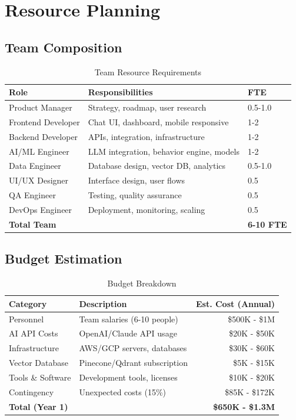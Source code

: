 \documentclass[12pt,a4paper]{article}
\begin{document}
\section{Resource Planning}

\subsection{Team Composition}

\begin{table}[h]
\centering
\begin{tabularx}{\textwidth}{|l|X|l|}
\hline
\textbf{Role} & \textbf{Responsibilities} & \textbf{FTE} \\
\hline
Product Manager & Strategy, roadmap, user research & 0.5-1.0 \\
\hline
Frontend Developer & Chat UI, dashboard, mobile responsive & 1-2 \\
\hline
Backend Developer & APIs, integration, infrastructure & 1-2 \\
\hline
AI/ML Engineer & LLM integration, behavior engine, models & 1-2 \\
\hline
Data Engineer & Database design, vector DB, analytics & 0.5-1.0 \\
\hline
UI/UX Designer & Interface design, user flows & 0.5 \\
\hline
QA Engineer & Testing, quality assurance & 0.5 \\
\hline
DevOps Engineer & Deployment, monitoring, scaling & 0.5 \\
\hline
\textbf{Total Team} & & \textbf{6-10 FTE} \\
\hline
\end{tabularx}
\caption{Team Resource Requirements}
\end{table}

\subsection{Budget Estimation}

\begin{table}[h]
\centering
\begin{tabularx}{\textwidth}{|l|X|r|}
\hline
\textbf{Category} & \textbf{Description} & \textbf{Est. Cost (Annual)} \\
\hline
Personnel & Team salaries (6-10 people) & \$500K - \$1M \\
\hline
AI API Costs & OpenAI/Claude API usage & \$20K - \$50K \\
\hline
Infrastructure & AWS/GCP servers, databases & \$30K - \$60K \\
\hline
Vector Database & Pinecone/Qdrant subscription & \$5K - \$15K \\
\hline
Tools \& Software & Development tools, licenses & \$10K - \$20K \\
\hline
Contingency & Unexpected costs (15\%) & \$85K - \$172K \\
\hline
\textbf{Total (Year 1)} & & \textbf{\$650K - \$1.3M} \\
\hline
\end{tabularx}
\caption{Budget Breakdown}
\end{table}
\end{document}
